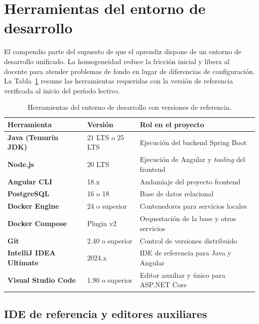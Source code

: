 \section{Herramientas del entorno de desarrollo}
\label{sec:u0:tools}

El compendio parte del supuesto de que el aprendiz dispone de un entorno de desarrollo unificado. La homogeneidad reduce la fricci\'on inicial y libera al docente para atender problemas de fondo en lugar de diferencias de configuraci\'on. La Tabla~\ref{tab:u0:tools} resume las herramientas requeridas con la versi\'on de referencia verificada al inicio del per\'iodo lectivo.

\begin{table}[htbp]
    \centering
    \caption{Herramientas del entorno de desarrollo con versiones de referencia.}
    \label{tab:u0:tools}
    \renewcommand{\arraystretch}{1.25}
    \begin{tabular}{>{\bfseries}p{4.0cm} p{3.4cm} p{6.3cm}}
        \toprule
        \rowcolor{uteqverde!12}
        \textnormal{\textbf{Herramienta}} & \textbf{Versi\'on} & \textbf{Rol en el proyecto} \\
        \midrule
        Java (Temurin JDK)       & 21 LTS o 25 LTS  & Ejecuci\'on del backend Spring Boot \\
        Node.js                  & 20 LTS           & Ejecuci\'on de Angular y \emph{tooling} del frontend \\
        Angular CLI              & 18.x             & Andamiaje del proyecto frontend \\
        PostgreSQL               & 16 o 18          & Base de datos relacional \\
        Docker Engine            & 24 o superior    & Contenedores para servicios locales \\
        Docker Compose           & Plugin v2        & Orquestaci\'on de la base y otros servicios \\
        Git                      & 2.40 o superior  & Control de versiones distribuido \\
        IntelliJ IDEA Ultimate   & 2024.x           & IDE de referencia para Java y Angular \\
        Visual Studio Code       & 1.90 o superior  & Editor auxiliar y \'unico para ASP.NET Core \\
        \bottomrule
    \end{tabular}
\end{table}

\subsection{IDE de referencia y editores auxiliares}
\label{sec:u0:tools:ide}

